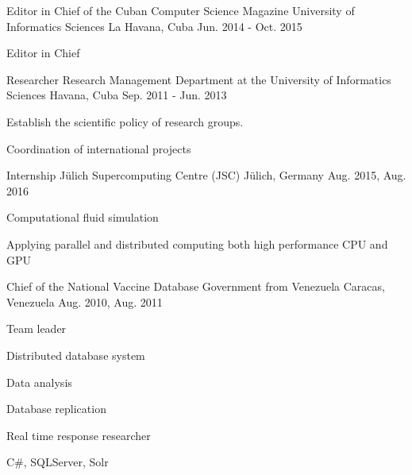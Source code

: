 \begin{cventries}
\cventry
{Editor in Chief of the Cuban Computer Science Magazine} %
{University of Informatics Sciences} %
{La Havana, Cuba} %
{Jun. 2014 - Oct. 2015} %
{ %
\begin{cvitems}
\item {Editor in Chief}
\end{cvitems}
}


\cventry
{Researcher} %
{Research Management Department at the University of Informatics Sciences} %
{Havana, Cuba} %
{Sep. 2011 - Jun. 2013} %
{ %
\begin{cvitems}
\item {Establish the scientific policy of research groups.}
\item {Coordination of international projects}
\end{cvitems} 
}


\cventry
{Internship} %
{Jülich Supercomputing Centre (JSC)} %
{Jülich, Germany} %
{Aug. 2015, Aug. 2016 } %
{ %
\begin{cvitems}
\item {Computational fluid simulation}
\item {Applying parallel and distributed computing both high performance CPU and GPU}
\end{cvitems}
}


\cventry
{Chief of the National Vaccine Database} %
{Government from Venezuela} %
{Caracas, Venezuela} %
{Aug. 2010, Aug. 2011 } %
{ %
\begin{cvitems}
\item {Team leader}
\item {Distributed database system}
\item {Data analysis}
\item {Database replication}
\item {Real time response researcher}
\item {C#, SQLServer, Solr}
\end{cvitems}
}


\end{cventries}
